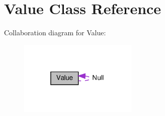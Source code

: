 \hypertarget{classValue}{}\section{Value Class Reference}
\label{classValue}


Collaboration diagram for Value\+:
\nopagebreak
\begin{figure}[H]
\begin{center}
\leavevmode
\includegraphics[width=160pt]{classValue__coll__graph}
\end{center}
\end{figure}

